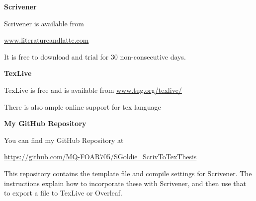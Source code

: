 \documentclass[unknownkeysallowed,usepdftitle=false, aspectratio=169,parskip=full]{beamer}
\newcommand{\secvariable}{nothing}
\newcommand{\mysection}[1]{\renewcommand{\secvariable}{#1}
}
\begin{document}
\mysection{radar}
\begin{frame}\label{\secvariable}
    \textbf{Scrivener}
    
    Scrivener is available from 
    
    \url{www.literatureandlatte.com}
    
    It is free to download and trial for 30 non-consecutive days. 
    
      \vspace{12pt}
    \textbf{TexLive}  
	
	TexLive is free and is available from \url{www.tug.org/texlive/}
	
	There is also ample online support for tex language
	
	\vspace{12pt}
	
	\textbf{My GitHub Repository}
	
	You can find my GitHub Repository at
	
\url{https://github.com/MQ-FOAR705/SGoldie_ScrivToTexThesis}

This repository contains the template file and compile settings for Scrivener. The instructions explain how to incorporate these with Scrivener, and then use that to export a file to TexLive or Overleaf.
	  
    
  
\end{frame}
\end{document}
